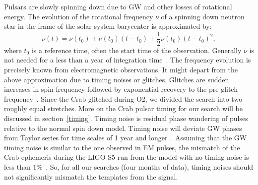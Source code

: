 \documentclass{ttuthes2007}
\begin{document}
Pulsars are slowly spinning down due to \ac{GW} and other losses of rotational
energy. The evolution of the rotational frequency $\nu$ of a spinning down neutron star in the
frame of the solar system barycenter is approximated by: 
\begin{equation}
 \nu(t) = \nu\left( t_0 \right) + \dot{\nu}\left( t_0 \right) \left( t-t_0
\right) + \frac{1}{2} \ddot{\nu}\left( t_0 \right) \left( t-t_0 \right)^2,
\end{equation} 
where $t_0$ is a reference time, often the start time of the observation.
Generally $\dddot{\nu}$ is not needed for a less than a year of integration
time~\cite{PhysRevD.100.064013}. The frequency evolution is precisely known from
electromagnetic observations. It might depart from the above approximation due
to timing noises or glitches. Glitches are sudden increases in spin frequency
followed by exponential recovery to the pre-glitch
frequency~\cite{Espinoza_2011}.  Since the Crab glitched during O2, we divided
the search into two roughly equal stretches. More on the Crab pulsar timing for
our search will be discussed in section~\ref{timing}.  Timing noise is residual
phase wandering of pulses relative to the normal spin down model.  Timing noise
will deviate \ac{GW} phases from Taylor series for time scales of 1 year and
longer~\cite{Jones_2004}. Assuming that the \ac{GW} timing noise is similar to the
one observed in EM pulses, the mismatch of the Crab ephemeris during the LIGO S5 run
from the model with no timing noise is less than
$1\%$~\cite{PhysRevD.91.062009}.  So, for all our searches (four months of
data), timing noises should not significantly mismatch the templates from the
signal.
\end{document}
